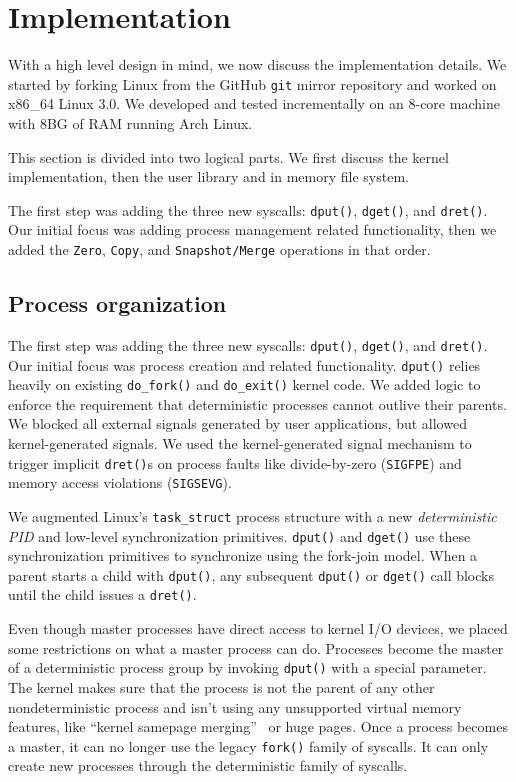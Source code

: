 
\section{Implementation}
\label{sec:impl}

With a high level design in mind, we now discuss the implementation details.
We started by forking Linux from the GitHub {\tt git} mirror repository and
worked on x86\_64 Linux 3.0. We developed and tested incrementally on an 8-core
machine with 8BG of RAM running Arch Linux.

This section is divided into two logical parts. We first discuss the kernel
implementation, then the user library and in memory file system.

The first step was adding the three new syscalls: {\tt dput()}, {\tt dget()},
and {\tt dret()}. Our initial focus was adding process management related
functionality, then we added the {\tt Zero}, {\tt Copy}, and
{\tt Snapshot/Merge} operations in that order.

\subsection{Process organization}

The first step was adding the three new syscalls: {\tt dput()}, {\tt dget()},
and {\tt dret()}. Our initial focus was process creation and related
functionality. {\tt dput()} relies heavily on existing {\tt do\_fork()} and
{\tt do\_exit()} kernel code.
We added logic to enforce the requirement that deterministic processes cannot
outlive their parents. We blocked all external signals generated by user
applications, but allowed kernel-generated signals. We used the kernel-generated
signal mechanism to trigger implicit {\tt dret()}s on process faults like
divide-by-zero ({\tt SIGFPE}) and memory access violations ({\tt SIGSEVG}).

We augmented Linux's {\tt task\_struct} process structure with a new
\emph{deterministic PID} and low-level synchronization primitives. {\tt dput()}
and {\tt dget()} use these synchronization primitives to synchronize using the
fork-join model. When a parent starts a child
with {\tt dput()}, any subsequent {\tt dput()} or {\tt dget()} call blocks until
the child issues a {\tt dret()}.

Even though master processes have direct access to kernel I/O devices, we placed
some restrictions on what a master process can do. Processes
become the master of a deterministic process group by invoking {\tt dput()} with
a special parameter. The kernel makes sure that the process is not the parent of
any other nondeterministic process and isn't using any
unsupported virtual memory features, like ``kernel samepage
merging''~\cite{arcangeli2009increasing} or huge pages. Once a process
becomes a master, it can no longer use the legacy {\tt fork()} family of
syscalls. It can only create new processes through the deterministic family
of syscalls.

